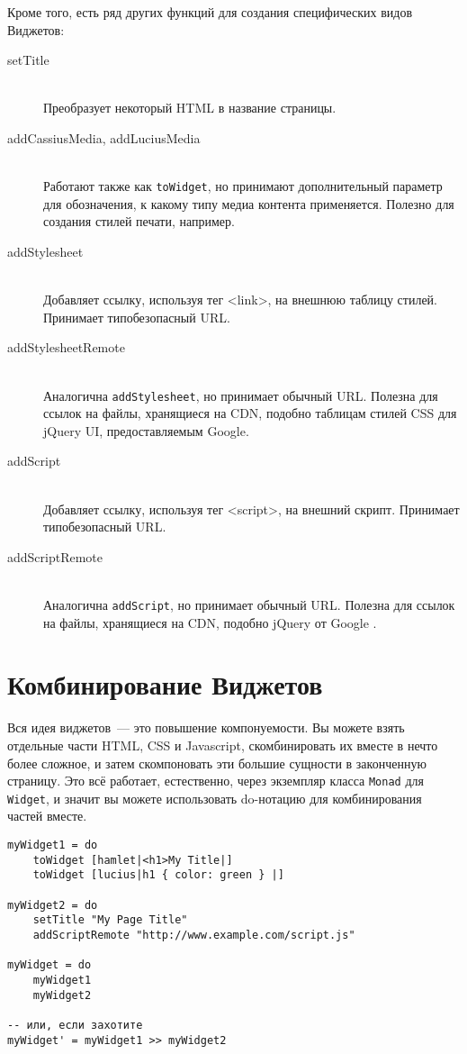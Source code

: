 Кроме того, есть ряд других функций для создания специфических видов Виджетов:
\begin{description}
    \item[setTitle] \hfill \\
        Преобразует некоторый HTML в название страницы.

    \item[addCassiusMedia, addLuciusMedia] \hfill \\
        Работают также как \lstinline'toWidget', но принимают дополнительный
        параметр для обозначения, к какому типу медиа контента применяется.
        Полезно для создания стилей печати, например.

    \item[addStylesheet] \hfill \\
        Добавляет ссылку, используя тег <link>, на внешнюю таблицу стилей.
        Принимает типобезопасный URL.

    \item[addStylesheetRemote] \hfill \\
        Аналогична \lstinline'addStylesheet', но принимает обычный URL. Полезна
        для ссылок на файлы, хранящиеся на CDN, подобно таблицам стилей CSS для
        jQuery UI, предоставляемым Google.

    \item[addScript] \hfill \\
        Добавляет ссылку, используя тег <script>, на внешний скрипт. Принимает
        типобезопасный URL.

    \item[addScriptRemote] \hfill \\
        Аналогична \lstinline'addScript', но принимает обычный URL. Полезна для
        ссылок на файлы, хранящиеся на CDN, подобно jQuery от Google .
\end{description}

\section{Комбинирование Виджетов}
Вся идея виджетов~--- это повышение компонуемости. Вы можете взять отдельные
части HTML, CSS и Javascript, скомбинировать их вместе в нечто более сложное, и
затем скомпоновать эти большие сущности в законченную страницу. Это всё
работает, естественно, через экземпляр класса \lstinline'Monad' для
\lstinline'Widget', и значит вы можете использовать do-нотацию для
комбинирования частей вместе.
\begin{lstlisting}[caption={Комбинирование Виджетов}]
myWidget1 = do
    toWidget [hamlet|<h1>My Title|]
    toWidget [lucius|h1 { color: green } |]

myWidget2 = do
    setTitle "My Page Title"
    addScriptRemote "http://www.example.com/script.js"

myWidget = do
    myWidget1
    myWidget2

-- или, если захотите
myWidget' = myWidget1 >> myWidget2
\end{lstlisting}

